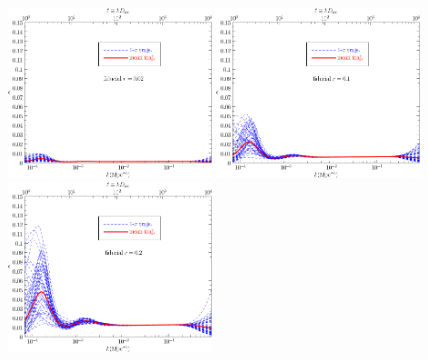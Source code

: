 \documentclass[a4paper,11pt]{article}
\def \halffigwidth{0.48\textwidth}
\begin{document}
\begin{figure}
  \includegraphics[width=\halffigwidth]{nobicep_spline0_p11_r0d02_eps_traj.pdf}%
  \includegraphics[width=\halffigwidth]{nobicep_spline0_p11_r0d1_eps_traj.pdf} 
  \includegraphics[width=\halffigwidth]{nobicep_spline0_p11_r0d2_eps_traj.pdf}%

\end{figure}
\end{document}
